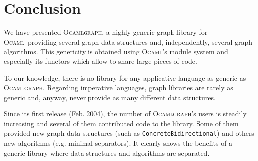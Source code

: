 \documentclass[tfpsymp]{tfp05symp}
\newcommand{\ocamlgraph}{\textsc{Ocamlgraph}\xspace}
\newcommand{\ocaml}{\textsc{Ocaml}\xspace}
\begin{document}
\section{Conclusion}

We have presented \ocamlgraph, a highly generic graph library for \ocaml\
providing several graph data structures and, independently, several
graph algorithms. This genericity is obtained using \ocaml's module
system and especially its functors which allow to share large pieces
of code.

To our knowledge, there is no library for any applicative language as
generic as \ocamlgraph. Regarding imperative languages, graph
libraries are rarely as generic and, anyway, never provide as many
different data structures.

Since its first release (Feb. 2004), the number of \ocamlgraph's users
is steadily increasing and several of them contributed code to the
library. Some of them provided new graph data structures (such as
\texttt{ConcreteBidirectional}) and others new algorithms
(e.g. minimal separators). It clearly shows the benefits of a generic
library where data structures and algorithms are separated.





\nocite{*}




\end{document}
